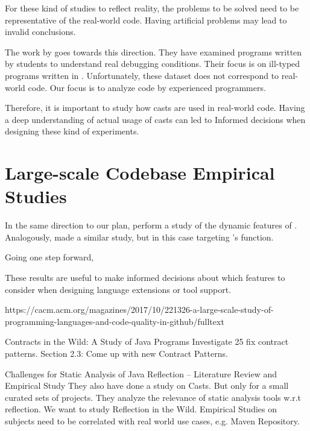 For these kind of studies to reflect reality, the problems to be solved need to
be representative of the real-world code.
Having artificial problems may lead to invalid conclusions.

The work by \cite{Wu:2017:TEF:3152284.3133929,Wu:2017:LUF:3152284.3133930} goes towards this direction.
They have examined programs written by students to understand real debugging conditions.
Their focus is on ill-typed programs written in \haskell{}.
Unfortunately, these dataset does not correspond to real-world code.
Our focus is to analyze code by experienced programmers.

Therefore, it is important to study how casts are used in real-world code.
Having a deep understanding of actual usage of casts can led to
Informed decisions when designing these kind of experiments.

\section{Large-scale Codebase Empirical Studies}

In the same direction to our plan, \cite{Callau:2011:DUD:1985441.1985448} perform a study of the dynamic features of \smalltalk{}.
Analogously, \cite{Richards:2011:EML:2032497.2032503} made a similar study, but in this case targeting \javascript{}'s \eval{} function.

Going one step forward, \cite{Ray:2017:LSP:3144574.3126905} 

These results are useful to make informed decisions about which features to consider when designing language extensions or tool support.

https://cacm.acm.org/magazines/2017/10/221326-a-large-scale-study-of-programming-languages-and-code-quality-in-github/fulltext



Contracts in the Wild: A Study of Java Programs
Investigate 25 fix contract patterns.
Section 2.3: Come up with new Contract Patterns.
\cite{dietrich_et_al:LIPIcs:2017:7259}

\cite{Landman:2017:CSA:3097368.3097429}
Challenges for Static Analysis of Java Reflection -- Literature Review and Empirical Study
They also have done a study on Casts.
But only for a small curated sets of projects.
They analyze the relevance of static analysis tools w.r.t reflection.
We want to study Reflection in the Wild.
Empirical Studies on subjects need to be correlated with real world use cases, e.g. Maven Repository.



